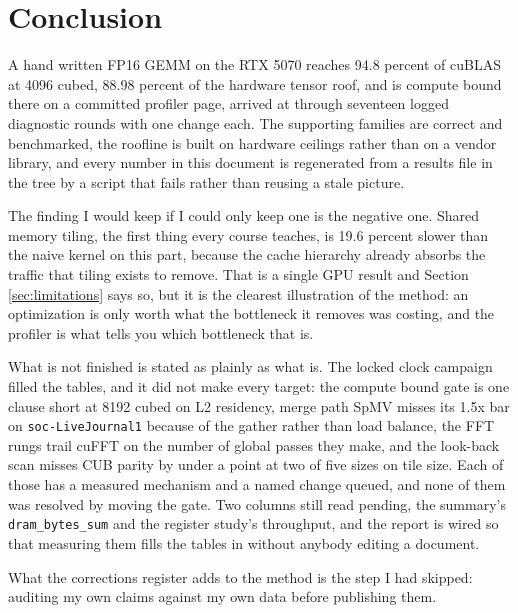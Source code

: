 \section{Conclusion}

A hand written FP16 GEMM on the RTX 5070 reaches 94.8 percent of cuBLAS at 4096
cubed, 88.98 percent of the hardware tensor roof, and is compute bound there on a
committed profiler page, arrived at through seventeen logged diagnostic rounds with
one change each. The supporting families are correct and benchmarked,
the roofline is built on hardware ceilings rather than on a vendor library, and
every number in this document is regenerated from a results file in the tree by a
script that fails rather than reusing a stale picture.

The finding I would keep if I could only keep one is the negative one. Shared
memory tiling, the first thing every course teaches, is 19.6 percent slower than the
naive kernel on this part, because the cache hierarchy already absorbs the traffic
that tiling exists to remove. That is a single GPU result and Section
\ref{sec:limitations} says so, but it is the clearest illustration of the method:
an optimization is only worth what the bottleneck it removes was costing, and the
profiler is what tells you which bottleneck that is.

What is not finished is stated as plainly as what is. The locked clock campaign
filled the tables, and it did not make every target: the compute bound gate is one
clause short at 8192 cubed on L2 residency, merge path SpMV misses its 1.5x bar on
\texttt{soc-LiveJournal1} because of the gather rather than load balance, the FFT
rungs trail cuFFT on the number of global passes they make, and the look-back scan
misses CUB parity by under a point at two of five sizes on tile size. Each of those
has a measured mechanism and a named change queued, and none of them was resolved
by moving the gate. Two columns still read pending, the summary's
\texttt{dram\_bytes\_sum} and the register study's throughput, and the report is
wired so that measuring them fills the tables in without anybody editing a
document.

What the corrections register adds to the method is the step I had skipped:
auditing my own claims against my own data before publishing them.
